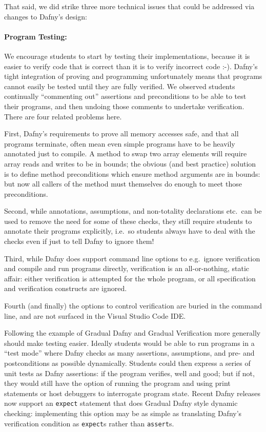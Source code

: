 \vspace*{5mm}

That said, we did strike three more technical issues that could be
addressed via changes to Dafny's design:

\paragraph{Program Testing:}  We encourage students to start by testing
their implementations, because it is easier to verify code that is
correct
than it is to
verify incorrect code :-).
%
Dafny’s tight integration of proving and programming unfortunately
means that programs cannot easily be tested until they are fully verified.
We observed students continually “commenting out” assertions and
preconditions to be able to test their programs, and then undoing
those comments to undertake verification. There are four related problems here.

First, Dafny's requirements to prove all memory accesses safe,
and that all programs terminate, often mean even simple programs
have to be heavily annotated just to compile.
A method to swap two array elements will require 
array reads and writes to be in bounds;
the obvious (and best practice) solution is
to define method preconditions which ensure method 
arguments are in bounds: but now all callers of the
method must themselves do enough to meet those preconditions. 

Second, while annotations, assumptions, and non-totality declarations etc.\ can be used 
to remove the need for some of these checks, they still require
students to annotate their programs explicitly, 
i.e.\ so students always have to deal with the checks
even if just to tell Dafny to ignore them!

Third, while Dafny does support command line options to e.g.\ 
ignore verification and compile and run programs directly,
verification is an all-or-nothing, static affair: either
verification is attempted for the whole program, or 
all specification and verification constructs are ignored.

Fourth (and finally) the options to control verification are buried in
the command line, and are not surfaced in the Visual Studio Code IDE.

Following the example of
Gradual Dafny \cite{Figueroa2018} and Gradual Verification 
\cite{Arlt2014,Bader2018,Wise2020}
more generally should make testing easier.
Ideally students would be able to run programs in a “test mode” where
Dafny checks as many assertions, assumptions, and pre- and postconditions
as possible dynamically.  Students could then express a series of unit tests as
Dafny assertions: if the program verifies, well and good; but if not,
they would still have the option of running the program and using
print statements or host debuggers to interrogate program state.
Recent Dafny releases 
\cite{Dafny3.0.0} 
now support an 
\texttt{expect} statement that does Gradual Dafny style dynamic
checking: implementing this option may be as simple as translating
Dafny's verification condition as \texttt{expect}s rather than \texttt{assert}s. 

